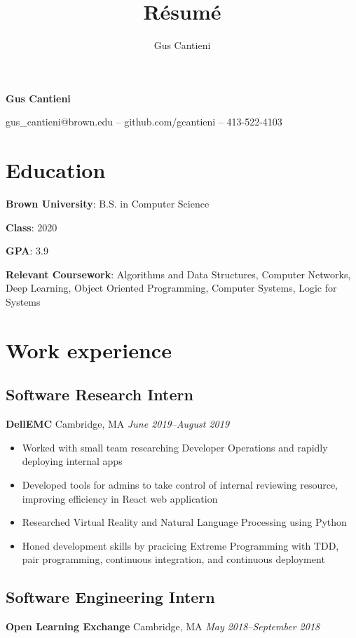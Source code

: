 \documentclass[11pt]{article}
\title{R\'esum\'e}
\author{Gus Cantieni}
\makeatletter
\renewcommand{\maketitle}{
	\begin{center}
		{\huge\bfseries Gus Cantieni}
		\vspace{0.20em}

		gus\_cantieni@brown.edu -- github.com/gcantieni -- 413-522-4103 
		\vspace{-1.50em}
	\end{center}
}
\makeatother
\begin{document}
\maketitle
\section{Education}
\vspace{0.20em}
\begin{minipage}{20em}
	\textbf{Brown University}: B.S. in Computer Science

	\textbf{Class}: 2020

	\textbf{GPA}: 3.9

	\vspace{0.5em}

\end{minipage}
\begin{minipage}{25em}

	\textbf{Relevant Coursework}: Algorithms and Data Structures, Computer Networks, Deep Learning, Object Oriented Programming, Computer Systems, Logic for Systems
\end{minipage}

\section{Work experience} 
\subsection{Software Research Intern} 
\textbf{DellEMC} Cambridge, MA \hfill \textit{June 2019--August 2019}
\begin{itemize}
	\item Worked with small team researching Developer Operations and rapidly deploying internal apps
	\item Developed tools for admins to take control of internal reviewing resource, improving efficiency in React web application
	\item Researched Virtual Reality and Natural Language Processing using Python
	\item Honed development skills by pracicing Extreme Programming with TDD, pair programming, continuous integration, and continuous deployment
\end{itemize}

\subsection{Software Engineering Intern} 
\textbf{Open Learning Exchange} Cambridge, MA \hfill \textit{May 2018--September 2018}
\end{document}
